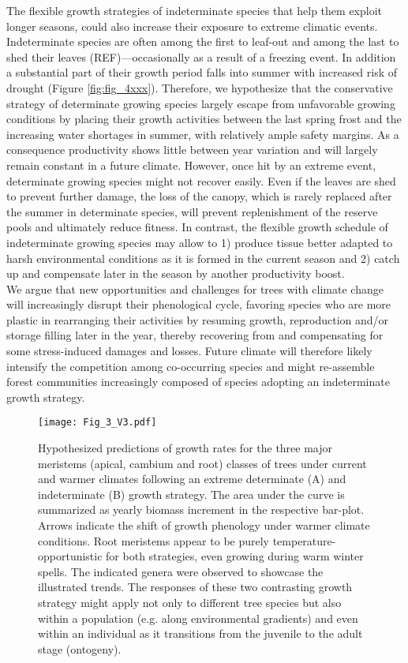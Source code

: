 \documentclass{article}
\begin{document}
The flexible growth strategies of indeterminate species that help them exploit longer seasons, could also increase their exposure to extreme climatic events. Indeterminate species are often among the first to leaf-out and among the last to shed their leaves (REF)---occasionally as a result of a freezing event. In addition a substantial part of their growth period falls into summer with increased risk of drought (Figure \ref{fig:fig_4xxx}). Therefore, we hypothesize that the conservative strategy of determinate growing species largely escape from unfavorable growing conditions by placing their growth activities between the last spring frost and the increasing water shortages in summer, with relatively ample safety margins. As a consequence productivity shows little between year variation and will largely remain constant in a future climate. However, once hit by an extreme event, determinate growing species might not recover easily. Even if the leaves are shed to prevent further damage, the loss of the canopy, which is rarely replaced after the summer in determinate species, will prevent replenishment of the reserve pools and ultimately reduce fitness. In contrast, the flexible growth schedule of indeterminate growing species may allow to 1) produce tissue better adapted to harsh environmental conditions as it is formed in the current season and 2) catch up and compensate later in the season by another productivity boost. \\

We argue that new opportunities and challenges for trees with climate change will increasingly disrupt their phenological cycle, favoring species who are more plastic in rearranging their activities by resuming growth, reproduction and/or storage filling later in the year, thereby recovering from and compensating for some stress-induced damages and losses. Future climate will therefore likely intensify the competition among co-occurring species and might re-assemble forest communities increasingly composed of species adopting an indeterminate growth strategy.
	
								\begin{figure}
								\centering
								\texttt{[image: Fig\_3\_V3.pdf]} 
								\caption{Hypothesized predictions of growth rates for the three major meristems (apical, cambium and root) classes of trees under current and warmer climates following an extreme determinate (A) and indeterminate (B) growth strategy. The area under the curve is summarized as yearly biomass increment in the respective bar-plot. Arrows indicate the shift of growth phenology under warmer climate conditions. Root meristems appear to be purely temperature-opportunistic for both strategies, even growing during warm winter spells. The indicated genera were observed to showcase the illustrated trends. The responses of these two contrasting growth strategy might apply not only to different tree species but also within a population (e.g. along environmental gradients) and even within an individual as it transitions from the juvenile to the adult stage (ontogeny).}
								\label{fig:fig_3xxx}
							\end{figure}
	
\end{document}
